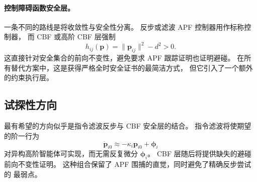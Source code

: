 \paragraph{控制障碍函数安全层。}
一条不同的路线是将收敛性与安全性分离。
反步或滤波 APF 控制器用作标称控制器，
而 CBF 或高阶 CBF 层强制
\[
h_{ij}(\bm p)=\|\bm p_{ij}\|^2-d^2>0.
\]
这直接针对安全集合的前向不变性，避免要求 APF 跟踪证明也证明避碰。
在所有替代方案中，这是获得严格全时安全证书的最简洁方式，
但它引入了一个额外的约束执行层。

\subsection{试探性方向}

最有希望的方向似乎是指令滤波反步与 CBF 安全层的结合。
指令滤波将使期望的阶一行为
\[
\dot{\bm p}_{i0}\approx -\kappa_i\bm p_{i0}+\bm\phi_i
\]
对异构高阶智能体可实现，而无需反复微分 $\bm\phi_i$。
CBF 层随后将提供缺失的避碰前向不变性证明。
这种组合保留了 APF 围捕的直觉，同时避免了精确反步尝试的
最弱点。